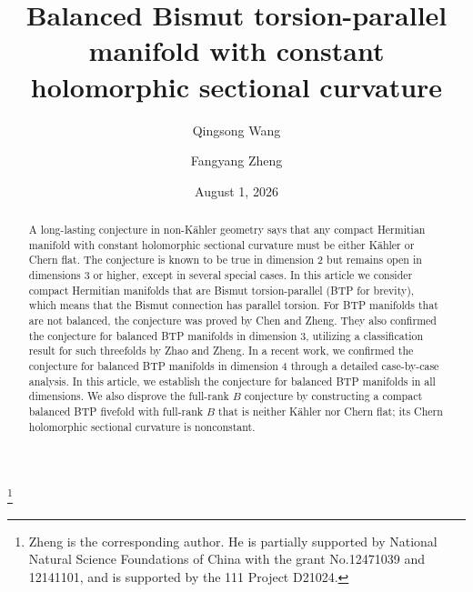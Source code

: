 \documentclass{amsart}
\begin{document}
\title[Balanced Bismut torsion-parallel manifold with constant holomorphic sectional curvature]{Balanced Bismut torsion-parallel manifold with constant holomorphic sectional curvature}


\author{Qingsong Wang}
\address{Qingsong Wang. Hal{\i}c{\i}o\u{g}lu Data Science Institute, University of California San Diego, La Jolla, CA 92093, USA}
\thanks{Zheng is the corresponding author. He is partially supported by National Natural Science Foundations of China
with the grant No.12471039 and  12141101, and is supported by the 111 Project D21024.}


\author{Fangyang Zheng}
\address{Fangyang Zheng. School of Mathematical Sciences, Chongqing Normal University, Chongqing 401331, China}



\begin{abstract}
A long-lasting conjecture in non-K\"ahler geometry says that any compact Hermitian manifold with constant holomorphic sectional curvature must be either K\"ahler or Chern flat. The conjecture is known to be true in dimension 2 but remains open in  dimensions 3 or higher, except in several special cases. In this article we consider compact Hermitian manifolds that are Bismut torsion-parallel (BTP for brevity), which means that the Bismut connection has parallel torsion. For BTP manifolds that are not balanced, the conjecture was proved by Chen and Zheng. They also confirmed the conjecture for balanced BTP manifolds in dimension 3, utilizing a classification result for such threefolds by Zhao and Zheng. In a recent work, we confirmed the conjecture for balanced BTP manifolds in dimension 4 through a detailed case-by-case analysis. In this article, we establish the conjecture for balanced BTP manifolds in all dimensions.  We also disprove the full-rank $B$ conjecture by constructing a compact balanced BTP fivefold with full-rank $B$ that is neither K\"ahler nor Chern flat; its Chern holomorphic sectional curvature is nonconstant.
 \end{abstract}


\date{August 1, 2026}

\maketitle
\end{document}

